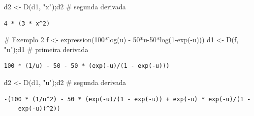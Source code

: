 \documentclass[
  letterpaper,
  DIV=11,
  numbers=noendperiod]{scrreprt}
\newenvironment{Shaded}{\begin{snugshade}}{\end{snugshade}}
\newcommand{\CommentTok}[1]{\textcolor[rgb]{0.37,0.37,0.37}{#1}}
\newcommand{\DecValTok}[1]{\textcolor[rgb]{0.68,0.00,0.00}{#1}}
\newcommand{\FunctionTok}[1]{\textcolor[rgb]{0.28,0.35,0.67}{#1}}
\newcommand{\NormalTok}[1]{\textcolor[rgb]{0.00,0.23,0.31}{#1}}
\newcommand{\OtherTok}[1]{\textcolor[rgb]{0.00,0.23,0.31}{#1}}
\newcommand{\SpecialCharTok}[1]{\textcolor[rgb]{0.37,0.37,0.37}{#1}}
\newcommand{\StringTok}[1]{\textcolor[rgb]{0.13,0.47,0.30}{#1}}
\begin{document}
\begin{Shaded}
\begin{Highlighting}[]
\NormalTok{d2 }\OtherTok{\textless{}{-}} \FunctionTok{D}\NormalTok{(d1, }\StringTok{"x"}\NormalTok{);d2 }\CommentTok{\# segunda derivada}
\end{Highlighting}
\end{Shaded}

\begin{verbatim}
4 * (3 * x^2)
\end{verbatim}

\begin{Shaded}
\begin{Highlighting}[]
\CommentTok{\# Exemplo 2 }
\NormalTok{f  }\OtherTok{\textless{}{-}} \FunctionTok{expression}\NormalTok{(}\DecValTok{100}\SpecialCharTok{*}\FunctionTok{log}\NormalTok{(u) }\SpecialCharTok{{-}} \DecValTok{50}\SpecialCharTok{*}\NormalTok{u}\DecValTok{{-}50}\SpecialCharTok{*}\FunctionTok{log}\NormalTok{(}\DecValTok{1}\SpecialCharTok{{-}}\FunctionTok{exp}\NormalTok{(}\SpecialCharTok{{-}}\NormalTok{u)))}
\NormalTok{d1 }\OtherTok{\textless{}{-}} \FunctionTok{D}\NormalTok{(f, }\StringTok{"u"}\NormalTok{);d1  }\CommentTok{\# primeira derivada}
\end{Highlighting}
\end{Shaded}

\begin{verbatim}
100 * (1/u) - 50 - 50 * (exp(-u)/(1 - exp(-u)))
\end{verbatim}

\begin{Shaded}
\begin{Highlighting}[]
\NormalTok{d2 }\OtherTok{\textless{}{-}} \FunctionTok{D}\NormalTok{(d1, }\StringTok{"u"}\NormalTok{);d2 }\CommentTok{\# segunda derivada}
\end{Highlighting}
\end{Shaded}

\begin{verbatim}
-(100 * (1/u^2) - 50 * (exp(-u)/(1 - exp(-u)) + exp(-u) * exp(-u)/(1 - 
    exp(-u))^2))
\end{verbatim}
\end{document}
